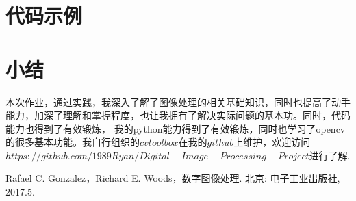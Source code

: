 \documentclass[UTF8]{ctexart}
\begin{document}
\section{代码示例}

\section{小结}

本次作业，通过实践，我深入了解了图像处理的相关基础知识，同时也提高了动手能力，加深了理解和掌握程度，也让我拥有了解决实际问题的基本功。同时，代码能力也得到了有效锻炼，
我的python能力得到了有效锻炼，同时也学习了opencv的很多基本功能。我自行组织的$cv toolbox$在我的$github$上维护，欢迎访问 \newline $https://github.com/1989Ryan/Digital-Image-Processing-Project$进行了解.

\newpage

\begin{thebibliography}{}

	 Rafael C. Gonzalez，Richard E. Woods，数字图像处理. 北京: 电子工业出版社, 2017.5.

\end{thebibliography}

\clearpage
\end{document}
